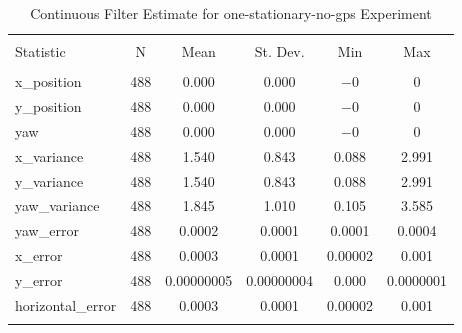 
\begin{table}[h] \centering 
  \caption{Continuous Filter Estimate for one-stationary-no-gps Experiment} 
  \label{tab:one_stationary_no_gps_continuous_summary} 
\begin{tabular}{@{\extracolsep{5pt}}lccccc} 
\\[-1.8ex]\hline 
\hline \\[-1.8ex] 
Statistic & \multicolumn{1}{c}{N} & \multicolumn{1}{c}{Mean} & \multicolumn{1}{c}{St. Dev.} & \multicolumn{1}{c}{Min} & \multicolumn{1}{c}{Max} \\ 
\hline \\[-1.8ex] 
x\_position & 488 & 0.000 & 0.000 & $-$0 & 0 \\ 
y\_position & 488 & 0.000 & 0.000 & $-$0 & 0 \\ 
yaw & 488 & 0.000 & 0.000 & $-$0 & 0 \\ 
x\_variance & 488 & 1.540 & 0.843 & 0.088 & 2.991 \\ 
y\_variance & 488 & 1.540 & 0.843 & 0.088 & 2.991 \\ 
yaw\_variance & 488 & 1.845 & 1.010 & 0.105 & 3.585 \\ 
yaw\_error & 488 & 0.0002 & 0.0001 & 0.0001 & 0.0004 \\ 
x\_error & 488 & 0.0003 & 0.0001 & 0.00002 & 0.001 \\ 
y\_error & 488 & 0.00000005 & 0.00000004 & 0.000 & 0.0000001 \\ 
horizontal\_error & 488 & 0.0003 & 0.0001 & 0.00002 & 0.001 \\ 
\hline \\[-1.8ex] 
\end{tabular} 
\end{table} 
